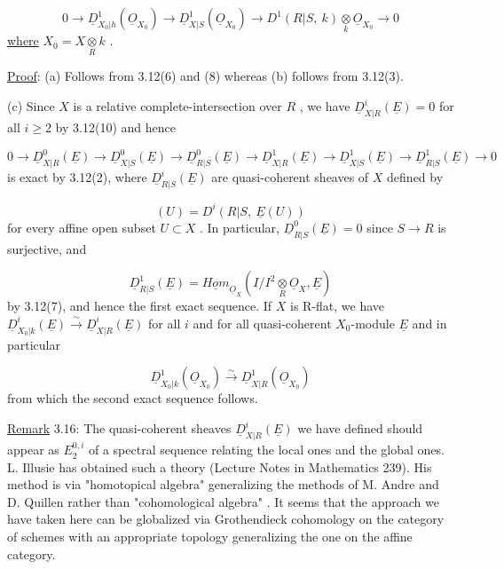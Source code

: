\begin{equation*}
0 \to \underline{D}^1_{X_0|h}(\underline{O}_{X_0}) \to \underline{D}^1_{X|S}(\underline{O}_{X_0}) \to D^1(R|S,\ k)\underset{k}{\otimes}\underline{O}_{X_0} \to 0
\end{equation*}
\underline{where}  $X_0 = X\underset{R}{\otimes}k$ .

\underline{Proof}:  (a)  Follows from 3.12(6) and (8) whereas (b) follows from 3.12(3).

(c)  Since  $X$  is a relative complete-intersection over  $R$ , we have $\underline{D}^i_{X|R}(\underline{E}) = 0$  for all  $i \geq 2$  by 3.12(10) and hence

\begin{equation*}
0 \to \underline{D}^0_{X|R}(\underline{E}) \to \underline{D}^0_{X|S}(\underline{E}) \to \underline{D}^0_{R|S}(\underline{E}) \to \underline{D}^1_{X|R}(\underline{E}) \to \underline{D}^1_{X|S}(\underline{E}) \to \underline{D}^1_{R|S}(\underline{E}) \to 0
\end{equation*}
is exact by 3.12(2), where  $\underline{D}^i_{R|S}(\underline{E})$  are quasi-coherent sheaves of  $X$  defined by

\begin{equation*}
[\underline{D}^i_{R|S}(\underline{E})](U) = D^i(R|S,\ \underline{E}(U))
\end{equation*}
for every affine open subset  $U \subset X$ . In particular,  $\underline{D}^0_{R|S}(\underline{E}) = 0$  since  $S \to R$ is surjective, and

\begin{equation*}
\underline{D}^1_{R|S}(\underline{E}) = \underline{Hom}_{\underline{O}_X}(I/I^2\underset{R}{\otimes}\underline{O}_X, \underline{E})
\end{equation*}
by 3.12(7), and hence the first exact sequence. If  $X$  is R-flat, we have
$\underline{D}^i_{X_0|k}(\underline{E}) \overset{\sim}{\to} \underline{D}^i_{X|R}(\underline{E})$  for all  $i$  and for all quasi-coherent $X_0$-module  $\underline{E}$  and in particular

\begin{equation*}
\underline{D}^1_{X_0|k}(\underline{O}_{X_0}) \overset{\sim}{\to} \underline{D}^1_{X|R}(\underline{O}_{X_0})
\end{equation*}
from which the second exact sequence follows.

\underline{Remark} 3.16:  The quasi-coherent sheaves  $\underline{D}^i_{X|R}(\underline{E})$  we have defined should appear as  $E_2^{0,i}$  of a spectral sequence relating the local ones and the global ones. L. Illusie has obtained such a theory (Lecture Notes in Mathematics 239). His method is via  "homotopical algebra"  generalizing the methods of M. Andre and D. Quillen rather than  "cohomological algebra" . It seems that the approach we have taken here can be globalized via Grothendieck cohomology on the category of schemes with an appropriate topology generalizing the one on the affine category.


